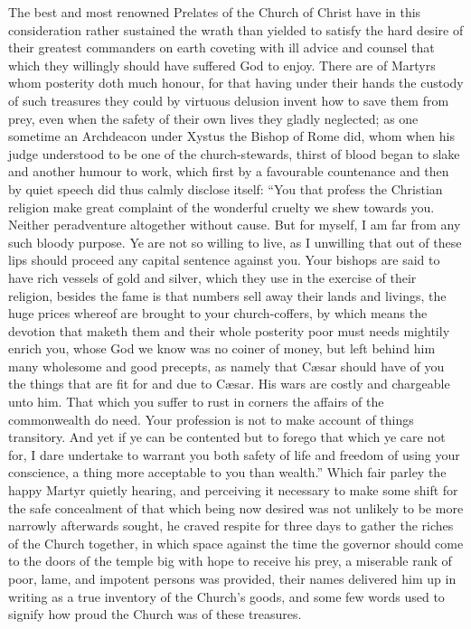 The best and most renowned Prelates of the Church of Christ have in this consideration rather sustained the wrath than yielded to satisfy the hard desire of their greatest commanders on earth coveting with ill advice and counsel that which they willingly should have suffered God to enjoy. There are of Martyrs whom posterity doth much honour, for that having under their hands the custody of such treasures they could by virtuous delusion invent how to save them from prey, even when the safety of their own lives they gladly neglected; as one sometime an Archdeacon under Xystus the Bishop of Rome did, whom when his judge understood to be one of the church-stewards, thirst of blood began to slake and another humour to work, which first by a favourable countenance  and then by quiet speech did thus calmly disclose itself: “You that profess the Christian religion make great complaint of the wonderful cruelty we shew towards you. Neither peradventure altogether without cause. But for myself, I am far from any such bloody purpose. Ye are not so willing to live, as I unwilling that out of these lips should proceed any capital sentence against you. Your bishops are said to have rich vessels of gold and silver, which they use in the exercise of their religion, besides the fame is that numbers sell away their lands and livings, the huge prices whereof are brought to your church-coffers, by which means the devotion that maketh them and their whole posterity poor must needs mightily enrich you, whose God we know was no coiner of money, but left behind him many wholesome and good precepts, as namely that Cæsar should have of you the things that are fit for and due to Cæsar. His wars are costly and chargeable unto him. That which you suffer to rust in corners the affairs of the commonwealth do need. Your profession is not to make account of things transitory. And yet if ye  can be contented but to forego that which ye care not for,
 I dare undertake to warrant you both safety of life and freedom of using your conscience, a thing more acceptable to you than wealth.” Which fair parley the happy Martyr quietly hearing, and perceiving it necessary to make some shift for the safe concealment of that which being now desired was not unlikely to be more narrowly afterwards sought, he craved respite for three days to gather the riches of the Church together, in which space against the time the governor should come to the doors of the temple big with hope to receive his prey, a miserable rank of poor, lame, and impotent persons was provided, their names delivered him up in writing as a true inventory of the Church’s goods, and some few words used to signify how proud the Church was of these treasures.

